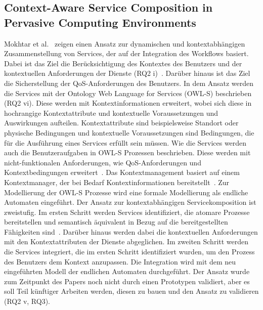 \documentclass[conference,compsoc]{IEEEtran}
\begin{document}
\subsection{Context-Aware Service Composition in Pervasive Computing Environments}
Mokhtar et al.~\cite{mokhtar2005context} zeigen einen Ansatz zur dynamischen und kontextabhängigen Zusammenstellung von Services, der auf der Integration des Workflows basiert. Dabei ist das Ziel die Berücksichtigung des Kontextes des Benutzers und der kontextuellen Anforderungen der Dienste (RQ2 i)~\cite{mokhtar2005context}. Darüber hinaus ist das Ziel die Sicherstellung der QoS-Anforderungen des Benutzers. In dem Ansatz werden die Services mit der Ontology Web Language for Services (OWL-S) beschrieben (RQ2 vi). Diese werden mit Kontextinformationen erweitert, wobei sich diese in hochrangige Kontextattribute und kontextuelle Voraussetzungen und Auswirkungen aufteilen. Kontextattribute sind beispielsweise Standort oder physische Bedingungen und kontextuelle Voraussetzungen sind Bedingungen, die für die Ausführung eines Services erfüllt sein müssen. Wie die Services werden auch die Benutzeraufgaben in OWL-S Prozessen beschrieben. Diese werden mit nicht-funktionalen Anforderungen, wie QoS-Anforderungen und Kontextbedingungen erweitert~\cite{mokhtar2005context}. Das Kontextmanagement basiert auf einem Kontextmanager, der bei Bedarf Kontextinformationen bereitstellt~\cite{mokhtar2005context}.
Zur Modellierung der OWL-S Prozesse wird eine formale Modellierung als endliche Automaten eingeführt.
Der Ansatz zur kontextabhängigen Servicekomposition ist zweistufig. Im ersten Schritt werden Services identifiziert, die atomare Prozesse bereitstellen und semantisch äquivalent in Bezug auf die bereitgestellten Fähigkeiten sind~\cite{mokhtar2005context}. Darüber hinaus werden dabei die kontextuellen Anforderungen mit den Kontextattributen der Dienste abgeglichen.
Im zweiten Schritt werden die Services integriert, die im ersten Schritt identifiziert wurden, um den Prozess des Benutzers dem Kontext anzupassen. Die Integration wird mit dem neu eingeführten Modell der endlichen Automaten durchgeführt.
Der Ansatz wurde zum Zeitpunkt des Papers noch nicht durch einen Prototypen validiert, aber es soll Teil künftiger Arbeiten werden, diesen zu bauen und den Ansatz zu validieren (RQ2 v, RQ3).
\end{document}
